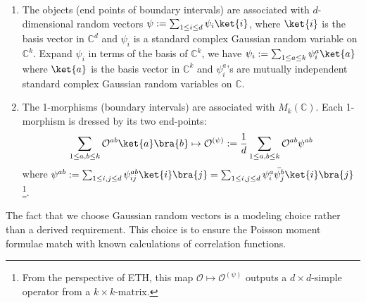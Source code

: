 \documentclass[a4paper,11pt]{article}
\theoremstyle{definition}
\numberwithin{equation}{section}
\newcommand{\mO}{\mathcal{O}}
\begin{document}
\begin{enumerate}
    \item The objects (end points of boundary intervals) are associated with $d$-dimensional random vectors $\psi := \sum_{1\leq i\leq d}\psi_i \ket{i}$, where $\ket{i}$ is the basis vector in $\mathbb{C}^d$ and $\psi_i$ is a standard complex Gaussian random variable on $\mathbb{C}^k$. Expand $\psi_i$ in terms of the basis of $\mathbb{C}^k$, we have $\psi_i := \sum_{1\leq a\leq k}\psi^a_i\ket{a}$ where $\ket{a}$ is the basis vector in $\mathbb{C}^k$ and $\psi^a_i$'s are mutually independent standard complex Gaussian random variables on $\mathbb{C}$.
    \item The 1-morphisms (boundary intervals) are associated with $M_k(\mathbb{C})$. Each 1-morphism is dressed by its two end-points:
    \begin{equation}
        \sum_{1\leq a,b\leq k}\mathcal{O}^{ab}\ket{a}\bra{b} \mapsto \mathcal{O}^{(\psi)}:=\frac{1}{d}\sum_{1\leq a,b\leq k}\mathcal{O}^{ab}\psi^{ab}
    \end{equation}
    where $\psi^{ab} := \sum_{1\leq i,j\leq d}\psi^{ab}_{ij}\ket{i}\bra{j} = \sum_{1\leq i,j\leq d}\psi^a_i\bar{\psi^b_j}\ket{i}\bra{j}$ \footnote{From the perspective of ETH, this map $\mO\mapsto \mO^{(\psi)}$ outputs a $d \times d$-simple operator from a $k \times k$-matrix.}.
\end{enumerate}
The fact that we choose Gaussian random vectors is a modeling choice rather than a derived requirement. This choice is to ensure the Poisson moment formulae match with known calculations of correlation functions.
\end{document}
